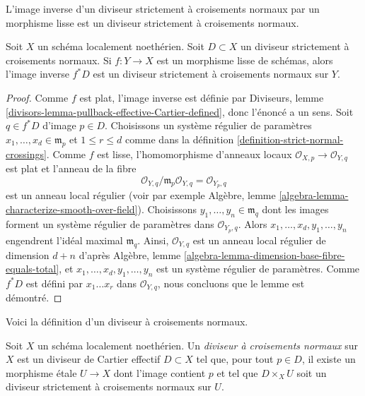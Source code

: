 \begin{lemma}
\label{lemma-smooth-pullback-strict-normal-crossings}
\begin{slogan}
L'image inverse d'un diviseur strictement à croisements normaux par un morphisme
lisse est un diviseur strictement à croisements normaux.
\end{slogan}
Soit $X$ un schéma localement noethérien. Soit $D \subset X$ un
diviseur strictement à croisements normaux. Si $f : Y \to X$ est un morphisme
lisse de schémas, alors l'image inverse $f^*D$ est un
diviseur strictement à croisements normaux sur $Y$.
\end{lemma}

\begin{proof}
Comme $f$ est plat, l'image inverse est définie par
Diviseurs, lemme \ref{divisors-lemma-pullback-effective-Cartier-defined},
donc l'énoncé a un sens.
Soit $q \in f^*D$ d'image $p \in D$. Choisissons un système régulier
de paramètres $x_1, \ldots, x_d \in \mathfrak m_p$
et $1 \leq r \leq d$ comme dans la
définition \ref{definition-strict-normal-crossings}.
Comme $f$ est lisse, l'homomorphisme d'anneaux locaux
$\mathcal{O}_{X, p} \to \mathcal{O}_{Y, q}$ est plat
et l'anneau de la fibre
$$
\mathcal{O}_{Y, q}/\mathfrak m_p \mathcal{O}_{Y, q} =
\mathcal{O}_{Y_p, q}
$$
est un anneau local régulier (voir par exemple
Algèbre, lemme \ref{algebra-lemma-characterize-smooth-over-field}).
Choisissons $y_1, \ldots, y_n \in \mathfrak m_q$ dont les images forment un système
régulier de paramètres dans $\mathcal{O}_{Y_p, q}$.
Alors $x_1, \ldots, x_d, y_1, \ldots, y_n$ engendrent l'idéal
maximal $\mathfrak m_q$. Ainsi, $\mathcal{O}_{Y, q}$
est un anneau local régulier de dimension
$d + n$ d'après Algèbre, lemme \ref{algebra-lemma-dimension-base-fibre-equals-total},
et $x_1, \ldots, x_d, y_1, \ldots, y_n$
est un système régulier de paramètres. Comme $f^*D$ est défini
par $x_1 \ldots x_r$ dans $\mathcal{O}_{Y, q}$, nous concluons
que le lemme est démontré.
\end{proof}

\noindent
Voici la définition d'un diviseur à croisements normaux.

\begin{definition}
\label{definition-normal-crossings}
Soit $X$ un schéma localement noethérien. Un {\it diviseur à croisements normaux}
sur $X$ est un diviseur de Cartier effectif $D \subset X$ tel que, pour
tout $p \in D$, il existe un morphisme \'etale $U \to X$ dont l'image
contient $p$ et tel que $D \times_X U$ soit un
diviseur strictement à croisements normaux sur $U$.
\end{definition}

